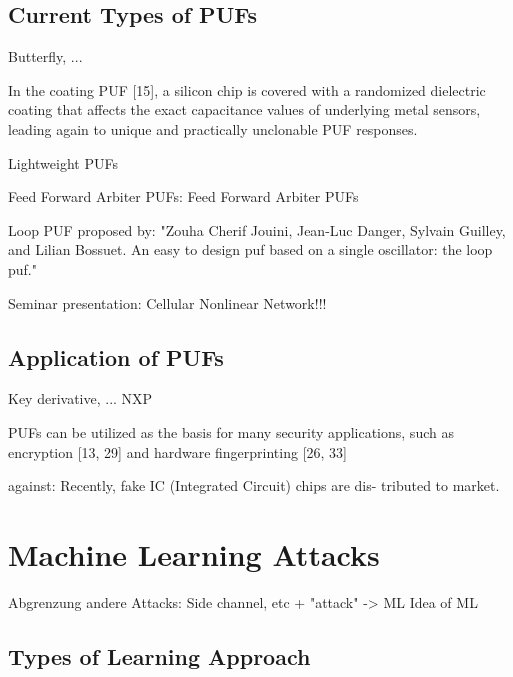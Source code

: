 \cite{Becker2015ThePUFs}


\subsection{Current Types of PUFs}
\label{sec:typesofpufs}

Butterfly, ...
\cite{Becker2015ThePUFs}

In the coating PUF [15], a silicon chip is covered with a randomized dielectric coating that affects the exact capacitance values of underlying metal sensors, leading again to unique and practically unclonable PUF responses. \cite{Armknecht2011AFunctions}

Lightweight PUFs \cite{Delvaux2014SecureImpossible}

Feed Forward Arbiter PUFs: Feed Forward Arbiter PUFs \cite{Ruhrmair2013PUFData}

Loop PUF proposed by: "Zouha Cherif Jouini, Jean-Luc Danger, Sylvain Guilley, and Lilian
Bossuet. An easy to design puf based on a single oscillator: the loop
puf."

Seminar presentation:
Cellular Nonlinear Network!!!

\apufs


\subsection{Application of PUFs}

Key derivative, ...
\cite{Becker2015ThePUFs} NXP

PUFs can be utilized as the basis for many security applications, such as encryption [13, 29] and hardware fingerprinting [26, 33]
\cite{Tajik2014PhysicalPUFs}

against: Recently, fake IC (Integrated Circuit) chips are dis- tributed to market.
\cite{Machida2015ImplementationFPGA}


\section{Machine Learning Attacks}

Abgrenzung andere Attacks: Side channel, etc + "attack" -> ML
Idea of ML

\subsection{Types of Learning Approach}


